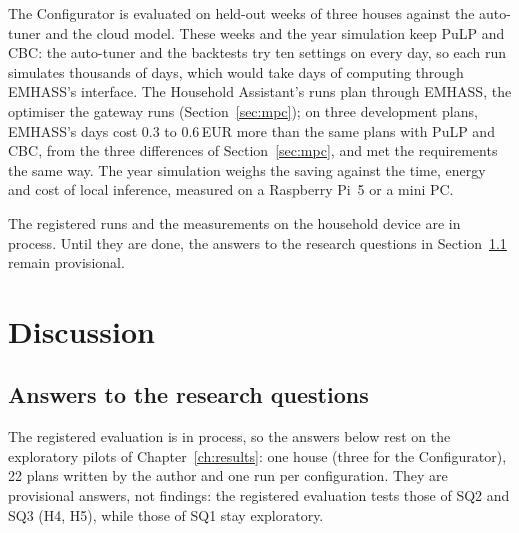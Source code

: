 \documentclass[12pt,a4paper]{report}
\begin{document}
The Configurator is evaluated on held-out weeks of three houses against
the auto-tuner and the cloud model. These weeks and the year simulation
keep PuLP and CBC: the auto-tuner and the backtests try ten settings on
every day, so each run simulates thousands of days, which would take
days of computing through EMHASS's interface. The Household Assistant's
runs plan through EMHASS, the optimiser the gateway runs
(Section~\ref{sec:mpc}); on three development plans, EMHASS's days cost
0.3 to 0.6\,EUR more than the same plans with PuLP and CBC, from the
three differences of Section~\ref{sec:mpc}, and met the requirements
the same way. The year simulation weighs the saving against the time,
energy and cost of local inference, measured on a Raspberry Pi~5 or a
mini PC.

The registered runs and the measurements on the household device are
in process. Until they are done, the answers to the research questions
in Section~\ref{sec:answers} remain provisional.

\chapter{Discussion}
\label{ch:discussion}

\section{Answers to the research questions}
\label{sec:answers}

The registered evaluation is in process, so the answers below rest on
the exploratory pilots of Chapter~\ref{ch:results}: one house (three
for the Configurator), 22 plans written by the author and one run per
configuration. They are
provisional answers, not findings: the registered evaluation tests
those of SQ2 and SQ3 (H4, H5), while those of SQ1 stay exploratory.
\end{document}
